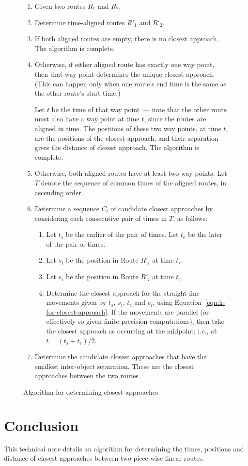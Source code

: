 \documentclass[times,12pt]{article}
\begin{document}
\begin{figure}[htb]
	\begin{enumerate}
		\item Given two routes $R_1$ and $R_2$.
		
		\item Determine time-aligned routes $R'_1$ and $R'_2$.
		
		\item If both aligned routes are empty, there is no closest approach. The algorithm is complete.
		
		\item Otherwise, if either aligned route has exactly one way point, then that way point determines the unique closest approach. (This can happen only when one route's end time is the same as the other route's start time.)
		
		Let $t$ be the time of that way point~--- note that the other route must also have a way point at time $t$, since the routes are aligned in time. The positions of these two way points, at time $t$, are the positions of the closest approach, and their separation gives the distance of closest approach. The algorithm is complete.
		
		\item Otherwise, both aligned routes have at least two way points. Let $T$ denote the sequence of common times of the aligned routes, in ascending order.
		
		\item Determine a sequence $C_l$ of candidate closest approaches by considering each consecutive pair of times in $T$, as follows:
		
		\begin{enumerate}
			\item Let $t_s$ be the earlier of the pair of times. Let $t_e$ be the later of the pair of times.
			
			\item Let $s_i$ be the position in Route $R'_i$ at time $t_s$.
			
			\item Let $e_i$ be the position in Route $R'_i$ at time $t_e$.
			
			\item Determine the closest approach for the straight-line movements given by $t_s$, $s_i$, $t_e$ and $e_i$, using Equation~\ref{eqn:k-for-closest-approach}. If the movements are parallel (or effectively so given finite precision computations), then take the closest approach as occurring at the midpoint; i.e., at $t = (t_s + t_e)/2$.
			
		\end{enumerate}
	
	\item Determine the candidate closest approaches that have the smallest inter-object separation. These are the closest approaches between the two routes.
	\end{enumerate}

\caption{Algorithm for determining closest approaches}
\label{fig:algorithm-for-closest-approaches}
\end{figure}

\section{Conclusion}
This technical note details an algorithm for determining the times, positions and distance of closest approaches between two piece-wise linear routes.
\end{document}
